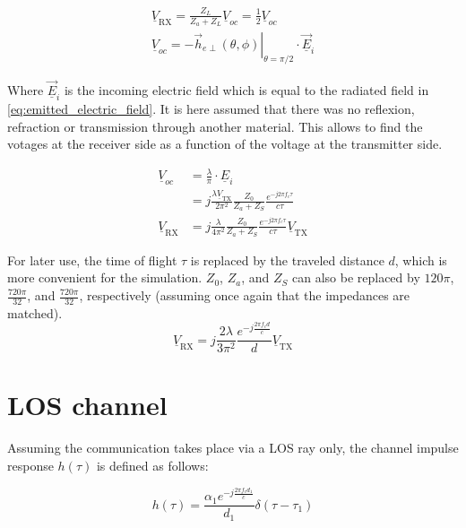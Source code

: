 \documentclass[10pt,a4paper]{ULBreport}
\begin{document}
\begin{align*}
    \underline{V}_{\text{RX}} = \frac{Z_L}{Z_a + Z_L} \underline{V}_{oc} = \frac{1}{2} \underline{V}_{oc}\\
    \underline{V}_{oc} = -\left . \vec{h}_{e\perp}(\theta, \phi)\right\vert_{\theta = \pi/2} \cdot \underline{\vec{E}}_i
\end{align*}

Where $\underline{\vec{E}}_i$ is the incoming electric field which is equal to the radiated field in \ref{eq:emitted_electric_field}. It is here assumed that there was no reflexion, refraction or transmission through another material. This allows to find the votages at the receiver side as a function of the voltage at the transmitter side.
\vspace{-1cm}

\begin{align*}
    \underline{V}_{oc} &= \frac{\lambda}{\pi} \cdot \underline{E}_i\\
    &= j\frac{\lambda\underline{V}_{\text{TX}}}{2\pi^2}\frac{Z_0}{Z_a + Z_S}\frac{e^{-j 2\pi f_c \tau}}{c\tau}\\
    \underline{V}_{\text{RX}} &= j\frac{\lambda}{4\pi^2}\frac{Z_0}{Z_a + Z_S}\frac{e^{-j 2\pi f_c \tau}}{c\tau} \underline{V}_{\text{TX}}
\end{align*}

For later use, the time of flight $\tau$ is replaced by the traveled distance $d$, which is more convenient for the simulation. $Z_0$, $Z_a$, and $Z_S$ can also be replaced by $120\pi$, $\frac{720\pi}{32}$, and $\frac{720\pi}{32}$, respectively (assuming once again that the impedances are matched).\\

\begin{equation}
    \underline{V}_{\text{RX}} = j\frac{2 \lambda }{3\pi^2}\frac{e^{-j\frac{2\pi f_c d}{c}}}{d}\underline{V}_{\text{TX}}
    \label{eq:voltage_RX}
\end{equation}

\section{LOS channel}
\label{sec:LOS_channel}

Assuming the communication takes place via a LOS ray only, the channel impulse response $h(\tau)$ is defined as follows:

\begin{equation*}
    h(\tau) = \frac{\alpha_1 e^{-j\frac{2\pi f_cd_1}{c}}}{d_1} \delta\left(\tau - \tau_1\right)
\end{equation*}
\end{document}
